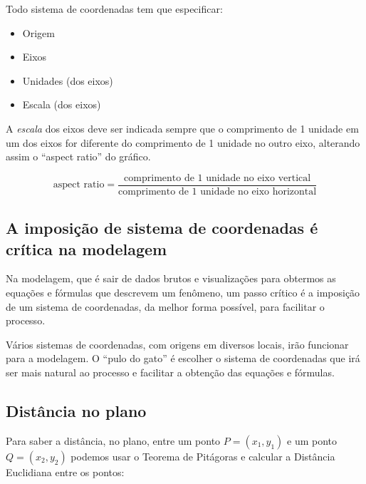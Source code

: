 \documentclass[pdftex, brazil, 12pt, twoside]{article}
\begin{document}
Todo sistema de coordenadas tem que especificar:

\begin{itemize}[noitemsep]
\item Origem
\item Eixos
\item Unidades (dos eixos)
\item Escala (dos eixos)
\end{itemize}

A \emph{escala} dos eixos deve ser indicada sempre que o comprimento de 1 unidade em um dos
eixos for diferente do comprimento de 1 unidade no outro eixo, alterando assim o
``aspect ratio'' do gráfico.

\begin{equation}
  \text{aspect ratio} = \frac{\text{comprimento de 1 unidade no eixo vertical}}{\text{comprimento de 1 unidade no eixo horizontal}}
\end{equation}


\subsection{A imposição de sistema de coordenadas é crítica na modelagem}
\label{sistema-coordenadas-critico-modelagem}

Na modelagem, que é sair de dados brutos e visualizações para obtermos as equações
e fórmulas que descrevem um fenômeno, um passo crítico é a imposição de um sistema
de coordenadas, da melhor forma possível, para facilitar o processo.

Vários sistemas de coordenadas, com origens em diversos locais, irão funcionar
para a modelagem. O ``pulo do gato'' é escolher o sistema de coordenadas que
irá ser mais natural ao processo e facilitar a obtenção das equações e fórmulas.

\subsection{Distância no plano}
\label{sistema-coordenadas-distancia-plano}

Para saber a distância, no plano, entre um ponto $P = (x_1, y_1)$ e um ponto
$Q = (x_2, y_2)$ podemos usar o Teorema de Pitágoras e calcular a Distância Euclidiana
entre os pontos:
\end{document}
